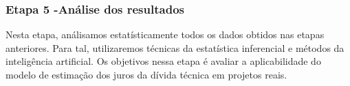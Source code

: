 \subsubsection{Etapa 5 -Análise dos resultados}


Nesta etapa, análisamos estatísticamente todos os dados obtidos nas etapas anteriores. Para tal, utilizaremos técnicas da estatística inferencial e métodos da inteligência artificial. Os objetivos nessa etapa é avaliar a aplicabilidade do modelo de estimação dos juros da dívida técnica em projetos reais.  









 










